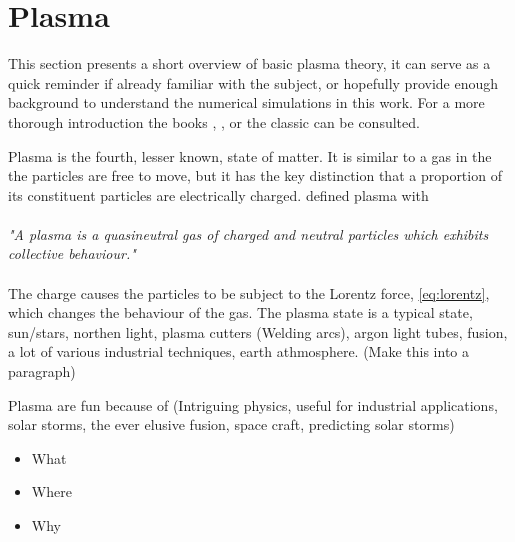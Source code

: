\section{Plasma}
	\label{sec:plasma}
	This section presents a short overview of basic plasma theory, it can serve as a
	quick reminder if already familiar with the subject, or hopefully provide enough
	background to understand the numerical simulations in this work.
	For a more thorough introduction the books \textit{}
    \citep{fitzpatrick_plasma_2014}, \textit{} \citep{goldston_introduction_1995},
    \textit{} \citep{pecseli_waves_2012} or the classic
    \textit{} \citep{chen_introduction_1984} can be consulted.

	Plasma is the fourth, lesser known, state of matter. It is similar to a gas
	in the the particles are free to move, but it has the key distinction that
	a proportion of its constituent particles are electrically charged. \citeauthor{chen_introduction_1984} defined plasma with
\\ \\
	\indent \textit{"A plasma is a quasineutral gas of charged and neutral particles which exhibits
	collective behaviour."}
\\ \\
	The charge causes the particles to be subject to the Lorentz force, \cref{eq:lorentz}, which
	changes the behaviour of the gas. The plasma state is a typical state,
	sun/stars, northen light, plasma cutters (Welding arcs), argon light tubes, fusion, a lot of various
	industrial techniques, earth athmosphere. (Make this into a paragraph)

	Plasma are fun because of (Intriguing physics, useful for industrial applications,
	solar storms, the ever elusive fusion, space craft, predicting solar storms)

    \begin{itemize}
        \item What
        \item Where
        \item Why
    \end{itemize}

